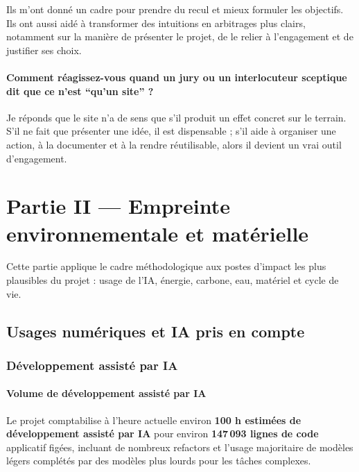 \documentclass[
  10pt,
  a4paper,
  DIV=11,
  numbers=noendperiod,
  oneside]{scrreprt}
\let\oldtextbf\textbf
\renewcommand{\textbf}[1]{\oldtextbf{\textcolor{cmmnavy}{#1}}}
\begin{document}
Ils m'ont donné un cadre pour prendre du recul et mieux formuler les
objectifs. Ils ont aussi aidé à transformer des intuitions en arbitrages
plus clairs, notamment sur la manière de présenter le projet, de le
relier à l'engagement et de justifier ses choix.

\subsubsection{Comment réagissez-vous quand un jury ou un interlocuteur
sceptique dit que ce n'est ``qu'un site''
?}\label{comment-ruxe9agissez-vous-quand-un-jury-ou-un-interlocuteur-sceptique-dit-que-ce-nest-quun-site}

Je réponds que le site n'a de sens que s'il produit un effet concret sur
le terrain. S'il ne fait que présenter une idée, il est dispensable ;
s'il aide à organiser une action, à la documenter et à la rendre
réutilisable, alors il devient un vrai outil d'engagement.

\chapter{Partie II --- Empreinte environnementale et
matérielle}\label{partie-ii-empreinte-environnementale-et-materielle}

Cette partie applique le cadre méthodologique aux postes d'impact les
plus plausibles du projet : usage de l'IA, énergie, carbone, eau,
matériel et cycle de vie.

\section{Usages numériques et IA pris en
compte}\label{usages-numuxe9riques-et-ia-pris-en-compte}

\subsection{Développement assisté par
IA}\label{duxe9veloppement-assistuxe9-par-ia}

\subsubsection{Volume de développement assisté par
IA}\label{volume-de-duxe9veloppement-assistuxe9-par-ia}

Le projet comptabilise à l'heure actuelle environ \textbf{100 h estimées
de développement assisté par IA} pour environ \textbf{147\,093 lignes de
code} applicatif figées, incluant de nombreux refactors et l'usage
majoritaire de modèles légers complétés par des modèles plus lourds pour
les tâches complexes.
\end{document}
